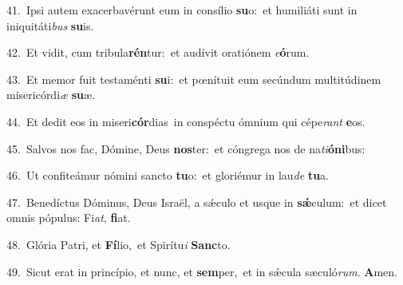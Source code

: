 {\numbfont\textcolor{\numbcolor}{41.}}~Ipsi autem exacerbavérunt eum in consílio \textbf{su}\-o:~\star et humiliáti sunt in iniquitáti\textit{bus} \textbf{su}\-is.\par
{\numbfont\textcolor{\numbcolor}{42.}}~Et vidit, cum tribula\-\textbf{rén}\-tur:~\star et audívit oratiónem \textit{e}\-\textbf{ó}rum.\par
{\numbfont\textcolor{\numbcolor}{43.}}~Et memor fuit testaménti \textbf{su}\-i:~\star et pœnítuit eum secúndum multitúdinem misericórdi\textit{æ} \textbf{su}\-æ.\par
{\numbfont\textcolor{\numbcolor}{44.}}~Et dedit eos in miseri\-\textbf{cór}\-dias~\star in conspéctu ómnium qui cépe\textit{rant} \textbf{e}\-os.\par
{\numbfont\textcolor{\numbcolor}{45.}}~Salvos nos fac, Dómine, Deus \textbf{nos}\-ter:~\star et cóngrega nos de na\-\textit{ti}\-\textbf{ó}\textbf{ni}bus:\par
{\numbfont\textcolor{\numbcolor}{46.}}~Ut confiteámur nómini sancto \textbf{tu}\-o:~\star et gloriémur in lau\textit{de} \textbf{tu}\-a.\par
{\numbfont\textcolor{\numbcolor}{47.}}~Benedíctus Dóminus, Deus Israël, a sǽculo et usque in \textbf{sǽ}\-culum:~\star et dicet omnis pópulus: Fi\-\textit{at}\-, \textbf{fi}\-at.\par
{\numbfont\textcolor{\numbcolor}{48.}}~Glória Patri, et \textbf{Fí}\-lio,~\star et Spirítu\textit{i} \textbf{Sanc}\-to.\par
{\numbfont\textcolor{\numbcolor}{49.}}~Sicut erat in princípio, et nunc, et \textbf{sem}\-per,~\star et in sǽcula sæculó\-\textit{rum}\-. \textbf{A}\-men.\par
